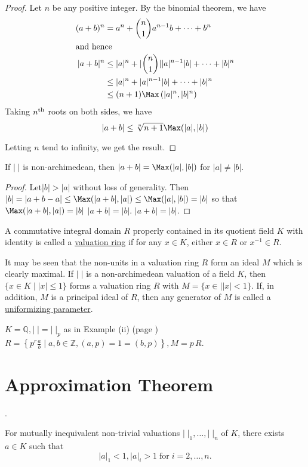\begin{proof}
Let $n$ be any positive integer. By the binomial theorem, we have
\begin{align*}
(a+b)^n & = a^n+\binom{n}{1}a^{n-1}b+\cdots +b^n\\
\intertext{and hence}
|a+b|^n & \leq |a|^n+|\binom{n}{1}||a|^{n-1} |b|+\cdots +|b|^n\\
& \leq |a|^n+|a|^{n-1}|b|+\cdots +|b|^n\\
& \leq (n+1)\Max \left(|a|^n, |b|^n\right)
\end{align*}
Taking $n^{\rm{th}}$ roots on both sides, we have
$$
|a+b|\leq \sqrt[n]{n+1} \Max (|a|, |b|)
$$

Letting $n$ tend to infinity, we get the result.
\end{proof}
\begin{coro*}
If $|\;|$ is non-archimedean, then $|a+b|=\Max (|a|, |b|)$ for 
$|a|\neq |b|$.
\end{coro*}
\begin{proof}
Let\pageoriginale $|b|>|a|$ without loss of generality. Then 
$|b|=|a+b-a| \leq\Max 
(|a+b|, |a|)\leq\Max (|a|,|b|)=|b|$ so that $\Max (|a+b|,|a|)=|b|$ \ie 
$|a+b|=|b|$.
$|a+b|=|b|$.
\end{proof}
\begin{defi*}
A commutative integral domain $R$ properly contained in its quotient 
field $K$ with identity is called a \underline{valuation ring} if for 
any $x\in K$, either $x\in R$ or $x^{-1}\in R$.
\end{defi*}

It may be seen that the non-units in a valuation ring $R$ form an 
ideal $M$ which is clearly maximal. If $|\;|$ is a non-archimedean 
valuation of a field $K$, then $\{ x\in K\mid |x|\leq 1\}$ forms a 
valuation ring $R$ with $M=\{x\in\mid |x|<1\}$. If, in addition, $M$ 
is a principal ideal of $R$, then any generator of $M$ is called a 
\underline{uniformizing parameter}.

\begin{example*}
$K=\mathbb{Q}, |\;|=|\;|_p$ as in Example (ii) (page \pageref{ex:ii}) 
$R=\left\{p^r\frac{a}{b}\mid a,b\in\mathbb{Z}, (a,p)=1=(b,p)\right\}, 
M=p\, R$.
\end{example*}


\section{Approximation Theorem}.\label{sec0.2}

\begin{prop}\label{prop:0.3}
For mutually inequivalent non-trivial valuations 
$|\;|_1,\ldots,|\;|_n$ of $K$, there exists $a\in K$ such that
$$
|a|_1<1, |a|_i>1 \; \text{for}\; i=2,\ldots,n.
$$
\end{prop}

